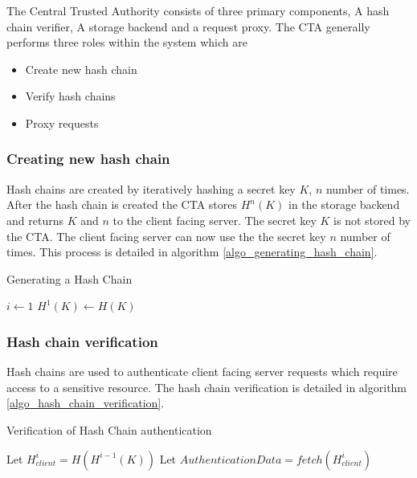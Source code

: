 \documentclass{sig-alternate-05-2015}
\begin{document}
The Central Trusted Authority consists of three primary components, A hash chain verifier, A storage backend and a request proxy. The CTA generally performs three roles within the system which are

\begin{itemize}
\item Create new hash chain
\item Verify hash chains
\item Proxy requests
\end{itemize}

\subsubsection*{Creating new hash chain}
Hash chains are created by iteratively hashing a secret key $K$, $n$ number of times. 
After the hash chain is created the CTA stores $H^{n}(K)$ in the storage backend and returns $K$ and $n$ to the client facing server. The secret key $K$ is not stored by the CTA. The client facing server can now use the the secret key $n$ number of times. This process is detailed in algorithm  \ref{algo_generating_hash_chain}.

\begin{algorithm}
\SetAlgoLined
\caption{Generating a Hash Chain}
\label{algo_generating_hash_chain}
\LinesNumbered
{}
$i \leftarrow 1 $\;
$H^{1}(K) \leftarrow H(K)$ \;
 \;
\end{algorithm}
\subsubsection*{Hash chain verification}
Hash chains are used to authenticate client facing server requests which require access to a sensitive resource. The hash chain verification is detailed in algorithm \ref{algo_hash_chain_verification}.

\begin{algorithm}
\label{algo_hash_chain_verification}
\SetAlgoLined
\caption{Verification of Hash Chain authentication}
\LinesNumbered
{}
	Let $H_{client}^{i} = H(H^{i-1}(K))$ \;
	Let $AuthenticationData = fetch(H_{client}^{i})$ \;
	
\end{algorithm}
\end{document}
